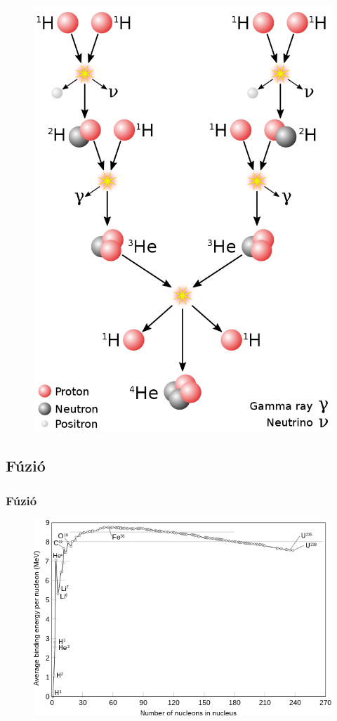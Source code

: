 \documentclass{beamer}
\begin{document}
\begin{frame}
\begin{figure}
        \includegraphics[scale=0.13]{800px-Fusion_in_the_Sun.svg.png}
    \end{figure} 
\end{frame}


\subsection{Fúzió}
\begin{frame}
    \frametitle{Fúzió}
    \begin{figure}
        \includegraphics[scale=0.5]{Binding_energy_curve_-_common_isotopes.svg.png}
    \end{figure} 
\end{frame}
\end{document}
